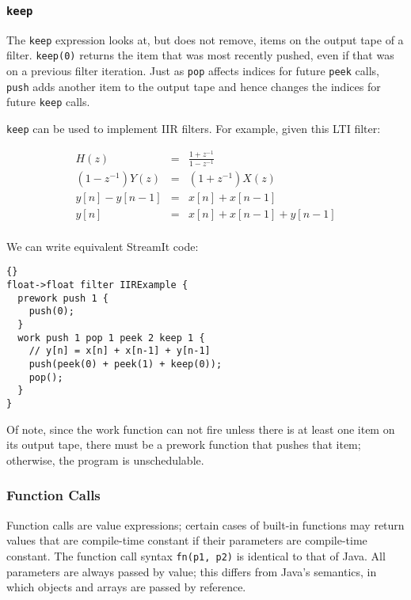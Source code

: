 \documentclass[11pt]{article}
\begin{document}
\subsubsection{\lstinline|keep|}

The \lstinline|keep| expression looks at, but does not remove, items
on the output tape of a filter.  \lstinline|keep(0)| returns the item
that was most recently pushed, even if that was on a previous filter
iteration.  Just as \lstinline|pop| affects indices for future
\lstinline|peek| calls, \lstinline|push| adds another item to the
output tape and hence changes the indices for future \lstinline|keep|
calls.

\lstinline|keep| can be used to implement IIR filters.  For example,
given this LTI filter:

\begin{eqnarray*}
H(z) & = & \frac{1+z^{-1}}{1-z^{-1}} \\
(1-z^{-1}) Y(z) & = & (1+z^{-1}) X(z) \\
y[n] - y[n-1] & = & x[n] + x[n-1] \\
y[n] & = & x[n] + x[n-1] + y[n-1] \\
\end{eqnarray*}

We can write equivalent StreamIt code:

\begin{lstlisting}{}
float->float filter IIRExample {
  prework push 1 {
    push(0);
  }
  work push 1 pop 1 peek 2 keep 1 {
    // y[n] = x[n] + x[n-1] + y[n-1]
    push(peek(0) + peek(1) + keep(0));
    pop();
  }
}
\end{lstlisting}

Of note, since the work function can not fire unless there is at least
one item on its output tape, there must be a prework function that
pushes that item; otherwise, the program is unschedulable.

\subsubsection{Function Calls}
\label{sec:expr-funcall}

Function calls are value expressions; certain cases of built-in
functions may return values that are compile-time constant if their
parameters are compile-time constant.  The function call syntax
\lstinline|fn(p1, p2)| is identical to that of Java.  All parameters are
always passed by value; this differs from Java's semantics, in which
objects and arrays are passed by reference.
\end{document}
